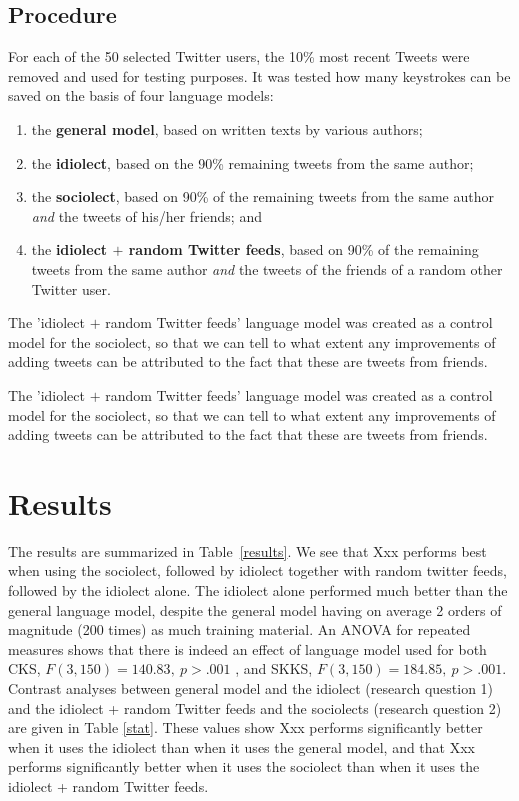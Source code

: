 \documentclass[11pt]{article}
\begin{document}
\subsection{Procedure}
For each of the 50 selected Twitter users, the 10\% most recent Tweets were removed and used for testing purposes. It was tested how many keystrokes can be saved on the basis of four language models:

\begin{enumerate}
\item the \textbf{general model}, based on written texts by various authors;
\item the \textbf{idiolect}, based on the 90\% remaining tweets from the same author;
\item the \textbf{sociolect}, based on 90\% of the remaining tweets from the same author \emph{and} the tweets of his/her friends; and
\item the \textbf{idiolect $+$ random Twitter feeds}, based on 90\% of the remaining tweets from the same author \emph{and} the tweets of the friends of a random other Twitter user.
\end{enumerate}

The 'idiolect $+$ random Twitter feeds' language model was created as a control model for the sociolect, so that we can tell to what extent any improvements of adding tweets can be attributed to the fact that these are tweets from friends.

The 'idiolect $+$ random Twitter feeds' language model was created as a control model for the sociolect, so that we can tell to what extent any improvements of adding tweets can be attributed to the fact that these are tweets from friends.

\section{Results}

The results are summarized in Table~\ref{results}. We see that Xxx performs best when using the sociolect, followed by idiolect together with random twitter feeds, followed by the idiolect alone. The idiolect alone performed much better than the general language model, despite the general model having on average 2 orders of magnitude (200 times) as much training material. An ANOVA for repeated measures shows that there is indeed an effect of language model used for both CKS, $F(3,150) = 140.83,\ p > .001$ , and SKKS, $F(3,150) = 184.85,\ p > .001$. Contrast analyses between general model and the idiolect (research question 1) and the idiolect + random Twitter feeds and the sociolects (research question 2) are given in Table \ref{stat}. These values show Xxx performs significantly better when it uses the idiolect than when it uses the general model, and that Xxx performs significantly better when it uses the sociolect than when it uses the idiolect + random Twitter feeds.
\end{document}
